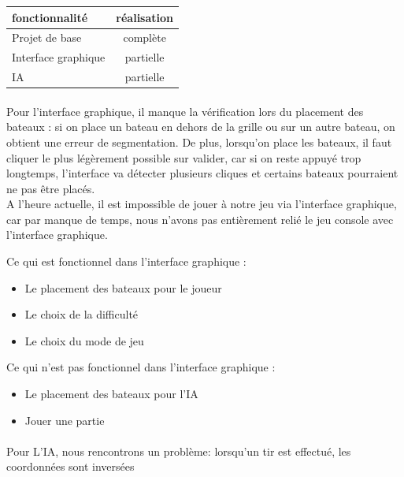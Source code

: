 \documentclass[a4paper,oneside]{article}
\begin{document}
\begin{tabular}{| l | c |}
\hline
fonctionnalité & réalisation \\
\hline
\hline
Projet de base & complète \\
\hline
Interface graphique & partielle \\
\hline
IA & partielle \\
\hline
\end{tabular}

\paragraph{}
Pour l'interface graphique, il manque la vérification lors du placement des bateaux : si on place un bateau en dehors de la grille ou sur un autre bateau, on obtient une erreur de segmentation. De plus, lorsqu'on place les bateaux, il faut cliquer le plus légèrement possible sur valider, car si on reste appuyé trop longtemps, l'interface va détecter plusieurs cliques et certains bateaux pourraient ne pas être placés.
\newline
\\

A l'heure actuelle, il est impossible de jouer à notre jeu via l'interface graphique, car par manque de temps, nous n'avons pas entièrement relié le jeu console avec l'interface graphique.


Ce qui est fonctionnel dans l'interface graphique :
\begin{itemize}
	\item Le placement des bateaux pour le joueur
	\item Le choix de la difficulté
	\item Le choix du mode de jeu
	\newline
	\\
\end{itemize}

Ce qui n'est pas fonctionnel dans l'interface graphique :
\begin{itemize}
	\item Le placement des bateaux pour l'IA
	\item Jouer une partie
\end{itemize}

\paragraph{}
Pour L'IA, nous rencontrons un problème: lorsqu'un tir est effectué, les coordonnées sont inversées
\end{document}
